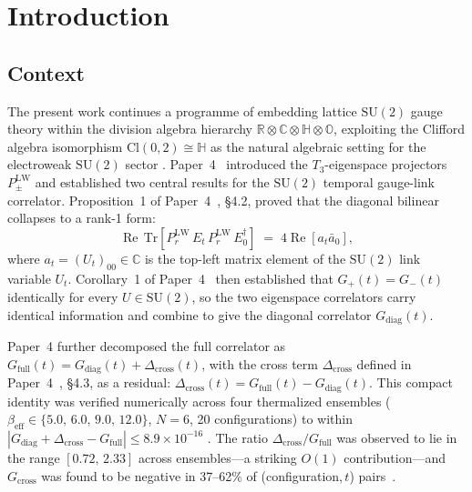 \documentclass[12pt]{article}
\numberwithin{equation}{section}
\theoremstyle{plain}
\theoremstyle{definition}
\theoremstyle{remark}
\newcommand{\cl}{\mathrm{Cl}}              %
\newcommand{\su}{\mathrm{SU}}              %
\newcommand{\tr}{\mathrm{Tr}}              %
\newcommand{\R}{\mathbb{R}}                %
\newcommand{\Cplx}{\mathbb{C}}             %
\newcommand{\HH}{\mathbb{H}}               %
\newcommand{\OO}{\mathbb{O}}               %
\newcommand{\Dix}{\R\otimes\Cplx\otimes\HH\otimes\OO}  %
\newcommand{\Gdiag}{G_{\mathrm{diag}}}     %
\newcommand{\Gcross}{G_{\mathrm{cross}}}   %
\newcommand{\Gfull}{G_{\mathrm{full}}}     %
\newcommand{\Dcross}{\Delta_{\mathrm{cross}}}  %
\newcommand{\PLW}{P^{\mathrm{LW}}}         %
\begin{document}
	\section{Introduction}
	\label{sec:intro}
	
	\subsection{Context}
	\label{sec:intro-context}
	
	The present work continues a programme of embedding lattice $\su(2)$
	gauge theory within the division algebra hierarchy $\Dix$, exploiting
	the Clifford algebra isomorphism $\cl(0,2)\cong\HH$ as the natural
	algebraic setting for the electroweak $\su(2)$ sector
	\cite{FirestoneP1,FirestoneP2,FirestoneP4}.
	Paper~4~\cite{FirestoneP4} introduced the $T_3$-eigenspace projectors
	$\PLW_\pm$ and established two central results for the $\su(2)$
	temporal gauge-link correlator.  Proposition~1 of
	Paper~4~\cite{FirestoneP4}, \S4.2, proved that the diagonal bilinear
	collapses to a rank-1 form:
	\[
	\operatorname{Re}\,\tr\!\left[\PLW_r\, E_t\,\PLW_r\, E_0^{\dagger}\right]
	\;=\; 4\operatorname{Re}[a_t \bar{a}_0],
	\]
	where $a_t = (U_t)_{00}\in\Cplx$ is the top-left matrix element of
	the $\su(2)$ link variable $U_t$.  Corollary~1 of
	Paper~4~\cite{FirestoneP4} then established that $G_+(t) = G_-(t)$
	identically for every $U\in\su(2)$, so the two eigenspace correlators
	carry identical information and combine to give the diagonal
	correlator $\Gdiag(t)$.
	
	Paper~4 further decomposed the full correlator as
	$\Gfull(t) = \Gdiag(t) + \Dcross(t)$, with the cross term $\Dcross$
	defined in Paper~4~\cite{FirestoneP4}, \S4.3, as a residual:
	$\Dcross(t) = \Gfull(t) - \Gdiag(t)$.  This compact identity was
	verified numerically across four thermalized ensembles
	($\beta_{\mathrm{eff}}\in\{5.0,\,6.0,\,9.0,\,12.0\}$, $N=6$, 20
	configurations) to within
	$|\Gdiag + \Dcross - \Gfull|\leq 8.9\times 10^{-16}$
	\cite{FirestoneP4}.  The ratio $\Dcross/\Gfull$ was observed to lie
	in the range $[0.72,\,2.33]$ across ensembles---a striking $O(1)$
	contribution---and $\Gcross$ was found to be negative in 37--62\% of
	(configuration,\,$t$) pairs~\cite{FirestoneP4}.
	
\end{document}
